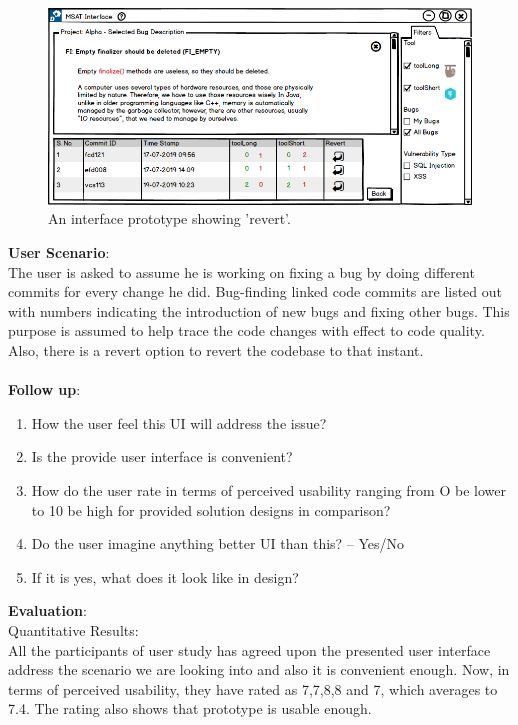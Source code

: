 \begin{figure}[hbt!]
	\centering
	\includegraphics[width=\linewidth]{figures/solution_ideas_snaps/S13_revert}
	\caption{An interface prototype showing 'revert'.}
	\label{fig:S13_revert}
\end{figure}


\textbf{User Scenario}: \\

The user is asked to assume he is working on fixing a bug by doing different commits for every change he did. Bug-finding linked code commits are listed out with numbers indicating the introduction of new bugs and fixing other bugs. This purpose is assumed to help trace the code changes with effect to code quality. Also, there is a revert option to revert the codebase to that instant. \\ \\

\textbf{Follow up}: \\

\begin{enumerate}
\item How the user feel this UI will address the issue?  
\item Is the provide user interface is convenient?
\item How do the user rate in terms of perceived usability ranging from O be lower to 10 be high for provided solution designs in comparison?
\item Do the user imagine anything better UI than this? – Yes/No
\item If it is yes, what does it look like in design?
\end{enumerate}

\textbf{Evaluation}: \\

Quantitative Results: \\

All the participants of user study has agreed upon the presented user interface address the scenario we are looking into and also it is convenient enough. Now, in terms of perceived usability, they have rated as 7,7,8,8 and 7, which averages to 7.4. The rating also shows that prototype is usable enough. \\ \\


